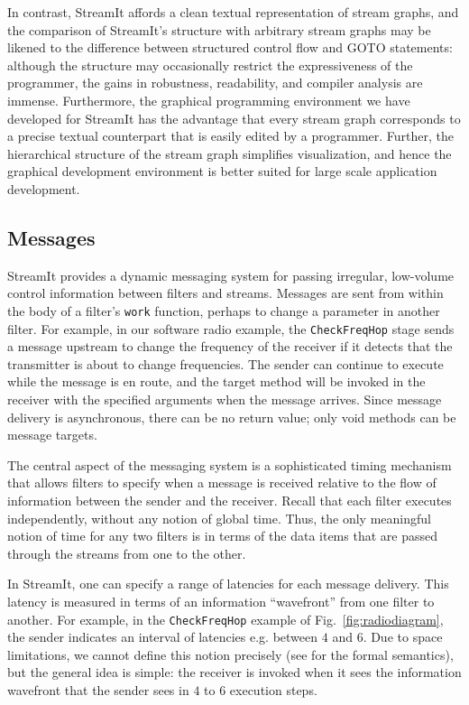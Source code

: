 \documentclass[final]{ijpp}
\begin{document}
In contrast, StreamIt affords a clean textual representation of stream
graphs,  and the  comparison  of StreamIt's  structure with  arbitrary
stream  graphs may  be likened  to the  difference  between structured
control  flow  and  GOTO   statements:  although  the  structure  may
occasionally restrict the expressiveness  of the programmer, the gains
in  robustness,  readability,   and  compiler  analysis  are  immense.
Furthermore, the  graphical programming environment  we have developed
for StreamIt has the advantage  that every stream graph corresponds to
a precise textual  counterpart that is easily edited  by a programmer.
Further,  the hierarchical  structure of  the stream  graph simplifies
visualization,  and  hence  the  graphical development  environment  is
better suited for large scale application development.

\subsection{Messages}

StreamIt provides  a dynamic  messaging system for  passing irregular,
low-volume control information  between filters and streams.  Messages
are sent  from within the  body of a filter's  \texttt{work} function,
perhaps to change a parameter  in another filter.  For example, in our
software  radio  example,  the  \texttt{CheckFreqHop}  stage  sends  a
message upstream to change the frequency of the receiver if it detects
that the transmitter  is about to change frequencies.   The sender can
continue  to execute while  the message  is en  route, and  the target
method will  be invoked in  the receiver with the  specified arguments
when  the message  arrives.  Since  message delivery  is asynchronous,
there  can  be no  return  value; only  void  methods  can be  message
targets.

The central aspect  of the messaging system is  a sophisticated timing
mechanism that  allows filters to  specify when a message  is received
relative  to  the flow  of  information  between  the sender  and  the
receiver.  Recall that each filter executes independently, without any
notion of global  time.  Thus, the only meaningful  notion of time for
any two filters is in terms  of the data items that are passed through
the streams from one to the other.

In StreamIt,  one can  specify a range  of latencies for  each message
delivery.   This  latency  is  measured  in terms  of  an  information
``wavefront''  from  one  filter  to  another.  For  example,  in  the
\texttt{CheckFreqHop}  example  of Fig.~\ref{fig:radiodiagram},  the
sender indicates  an interval of  latencies e.g. between $4$  and $6$.
Due to space limitations, we  cannot define this notion precisely (see
\cite{streamittech620,streamittech622} for  the formal semantics), but
the general idea  is simple: the receiver is invoked  when it sees the
information wavefront  that the  sender sees in  $4$ to  $6$ execution
steps.
\end{document}
